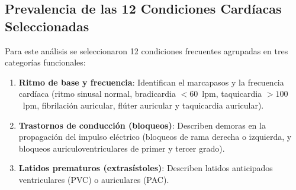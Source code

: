 \documentclass[11pt,a4paper]{article}
\begin{document}
\subsection{Prevalencia de las 12 Condiciones Cardíacas Seleccionadas}
Para este análisis se seleccionaron 12 condiciones frecuentes agrupadas en tres categorías funcionales:
\begin{enumerate}[topsep=1pt, itemsep=1pt, parsep=0pt]
    \item \textbf{Ritmo de base y frecuencia}: Identifican el marcapasos y la frecuencia cardíaca (ritmo sinusal normal, bradicardia $<60$~lpm, taquicardia $>100$~lpm, fibrilación auricular, flúter auricular y taquicardia auricular).
    \item \textbf{Trastornos de conducción (bloqueos)}: Describen demoras en la propagación del impulso eléctrico (bloqueos de rama derecha o izquierda, y bloqueos auriculoventriculares de primer y tercer grado).
    \item \textbf{Latidos prematuros (extrasístoles)}: Describen latidos anticipados ventriculares (PVC) o auriculares (PAC).
\end{enumerate}
\end{document}
